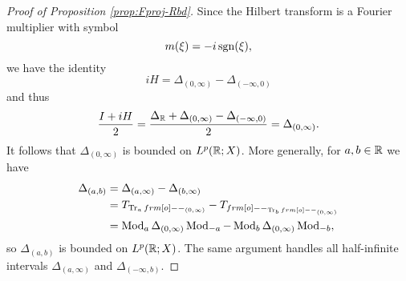 \begin{proof}[Proof of Proposition \ref{prop:Fproj-Rbd}]
  Since the Hilbert transform is a Fourier multiplier with symbol
  \begin{equation*}
    m(\xi) = -i\operatorname{sgn}(\xi),
  \end{equation*}
   we have the identity
  \begin{equation*}
    iH = \Delta_{(0,\infty)} -\Delta_{(-\infty,0)}
  \end{equation*}
  and thus
  \begin{equation*}
    \frac{I + iH}{2} = \frac{\Delta_{\mathbb{R}} + \Delta_{(0,\infty)} -\Delta_{(-\infty,0)}}{2} = \Delta_{(0,\infty)}.
  \end{equation*}
  It follows that $\Delta_{(0,\infty)}$ is bounded on $L^p(\mathbb{R};X)$.
  More generally, for $a,b \in \mathbb{R}$ we have
  \begin{equation*}
    \begin{aligned}
      \Delta_{(a,b)} &= \Delta_{(a,\infty)} - \Delta_{(b,\infty)} \\
      &= T_{\Tr_{a} \1_{(0,\infty)}} - T_{\1_{\Tr_{b} \1_{(0,\infty)}}} \\
      &= \Mod_{a} \Delta_{(0,\infty)} \Mod_{-a} - \Mod_{b} \Delta_{(0,\infty)} \Mod_{-b},
    \end{aligned}
  \end{equation*}
  so $\Delta_{(a,b)}$ is bounded on $L^p(\mathbb{R};X)$.
  The same argument handles all half-infinite intervals $\Delta_{(a,\infty)}$ and $\Delta_{(-\infty,b)}$.


\end{proof}
